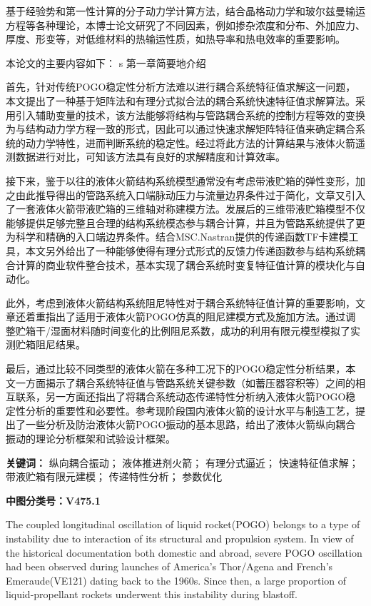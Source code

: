 
基于经验势和第一性计算的分子动力学计算方法，结合晶格动力学和玻尔兹曼输运方程等各种理论，本博士论文研究了不同因素，例如掺杂浓度和分布、外加应力、厚度、形变等，对低维材料的热输运性质，如热导率和热电效率的重要影响。

本论文的主要内容如下：
s
第一章简要地介绍

首先，针对传统POGO稳定性分析方法难以进行耦合系统特征值求解这一问题，本文提出了一种基于矩阵法和有理分式拟合法的耦合系统快速特征值求解算法。采用引入辅助变量的技术，该方法能够将结构与管路耦合系统的控制方程等效的变换为与结构动力学方程一致的形式，因此可以通过快速求解矩阵特征值来确定耦合系统的动力学特性，进而判断系统的稳定性。经过将此方法的计算结果与液体火箭遥测数据进行对比，可知该方法具有良好的求解精度和计算效率。

接下来，鉴于以往的液体火箭结构系统模型通常没有考虑带液贮箱的弹性变形，加之由此推导得出的管路系统入口端脉动压力与流量边界条件过于简化，文章又引入了一套液体火箭带液贮箱的三维轴对称建模方法。发展后的三维带液贮箱模型不仅能够提供足够完整且合理的结构系统模态参与耦合计算，并且为管路系统提供了更为科学和精确的入口端边界条件。结合MSC.Nastran提供的传递函数TF卡建模工具，本文另外给出了一种能够使得有理分式形式的反馈力传递函数参与结构系统耦合计算的商业软件整合技术，基本实现了耦合系统时变复特征值计算的模块化与自动化。

此外，考虑到液体火箭结构系统阻尼特性对于耦合系统特征值计算的重要影响，文章还着重指出了适用于液体火箭POGO仿真的阻尼建模方式及施加方法。通过调整贮箱干/湿面材料随时间变化的比例阻尼系数，成功的利用有限元模型模拟了实测贮箱阻尼结果。

最后，通过比较不同类型的液体火箭在多种工况下的POGO稳定性分析结果，本文一方面揭示了耦合系统特征值与管路系统关键参数（如蓄压器容积等）之间的相互联系，另一方面还指出了将耦合系统动态传递特性分析纳入液体火箭POGO稳定性分析的重要性和必要性。参考现阶段国内液体火箭的设计水平与制造工艺，提出了一些分析及防治液体火箭POGO振动的基本思路，给出了液体火箭纵向耦合振动的理论分析框架和试验设计框架。

\bigskip
\noindent \textbf{关键词：\hspace{\Han}}
纵向耦合振动；\;
液体推进剂火箭；\;
有理分式逼近；\;
快速特征值求解；\;
带液贮箱有限元建模；\;
传递特性分析；\;
参数优化

\bigskip
\noindent \textbf{中图分类号：\hspace{\Han}V475.1}

The coupled longitudinal oscillation of liquid rocket(POGO) belongs to a type of instability due to interaction of its structural and propulsion system. In view of the historical documentation both domestic and abroad, severe POGO oscillation had been observed during launches of America's Thor/Agena and French's Emeraude(VE121) dating back to the 1960s. Since then, a large proportion of liquid-propellant rockets underwent this instability during blastoff.


